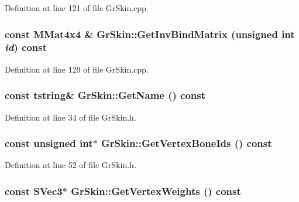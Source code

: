 Definition at line 121 of file GrSkin.cpp.\hypertarget{class_gr_skin_028df15246d94a33ec7fac21d8bfb126}{
\subsubsection[{GetInvBindMatrix}]{\setlength{\rightskip}{0pt plus 5cm}const {\bf MMat4x4} \& GrSkin::GetInvBindMatrix (unsigned int {\em id}) const}}
\label{class_gr_skin_028df15246d94a33ec7fac21d8bfb126}




Definition at line 129 of file GrSkin.cpp.\hypertarget{class_gr_skin_ec9baeb9cbd26de5ab8747c8c81a7ff6}{
\subsubsection[{GetName}]{\setlength{\rightskip}{0pt plus 5cm}const {\bf tstring}\& GrSkin::GetName () const}}
\label{class_gr_skin_ec9baeb9cbd26de5ab8747c8c81a7ff6}




Definition at line 34 of file GrSkin.h.\hypertarget{class_gr_skin_5ca027b19b338d5b1357686497d780a0}{
\subsubsection[{GetVertexBoneIds}]{\setlength{\rightskip}{0pt plus 5cm}const unsigned int$\ast$ GrSkin::GetVertexBoneIds () const}}
\label{class_gr_skin_5ca027b19b338d5b1357686497d780a0}




Definition at line 52 of file GrSkin.h.\hypertarget{class_gr_skin_abc63a0ed0091701f1cb8ceea66bbd11}{
\subsubsection[{GetVertexWeights}]{\setlength{\rightskip}{0pt plus 5cm}const {\bf SVec3}$\ast$ GrSkin::GetVertexWeights () const}}
\label{class_gr_skin_abc63a0ed0091701f1cb8ceea66bbd11}




